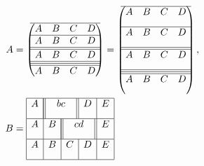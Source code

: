 \documentclass[11pt]{revtex4-1}
\begin{document}

\begin{align}
  A &= \begin{pmatrix}
    \hline
    A & B & C & D \\ \hline
    A & B & C & D \\ \hline \hline
    A & B & C & D \\ \hline \hline \hline
    A & B & C & D \\
  \end{pmatrix} = \begin{pmatrix}
    \hline
    A & B & C & D \\[3mm] \hline
    A & B & C & D \\[3mm] \hline \hline
    A & B & C & D \\[3mm] \hline \hline \hline
    A & B & C & D \\[3mm]
  \end{pmatrix}, \\
  B &= \begin{array}{|c|c|c|c|c|}
    \hline
    A & \multicolumn{2}{||c||}{bc} & D & E \\[3mm] \hline
    A & B & \multicolumn{2}{||c||}{cd} & E \\[3mm] \hline
    A & B & C & D & E \\[3mm] \hline
  \end{array}
\end{align}
\end{document}
